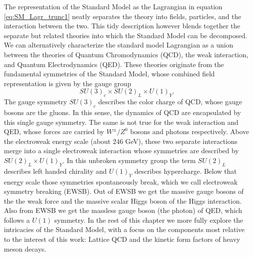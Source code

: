 The representation of the Standard Model as the Lagrangian in equation \ref{eq:SM_Lagr_trunc1} neatly separates the theory into fields, particles, and the interaction between the two.  This tidy description however blends together the separate but related theories into which the Standard Model can be decomposed.  We can alternatively characterize the standard model Lagrangian as a union between the theories of Quantum Chromodynamics (QCD), the weak interaction, and Quantum Electrodynamics (QED). These theories originate from the fundamental symmetries of the Standard Model, whose combined field representation is given by the gauge group
\begin{equation}
    SU(3)_c\times SU(2)_L\times U(1)_Y.
\end{equation}
The gauge symmetry $SU(3)_c$ describes the color charge of QCD, whose gauge bosons are the gluons.  In this sense, the dynamics of QCD are encapsulated by this single gauge symmetry.  The same is not true for the weak interaction and QED, whose forces are carried by $W^\pm/Z^0$ bosons and photons respectively.  Above the electroweak energy scale (about $246$ GeV), these two separate interactions merge into a single electroweak interaction whose symmetries are described by $SU(2)_L\times U(1)_Y$.  In this unbroken symmetry group the term $SU(2)_L$ describes left handed chirality and $U(1)_Y$ describes hypercharge.  Below that energy scale those symmetries spontaneously break, which we call electroweak symmetry breaking (EWSB).  Out of EWSB we get the massive gauge bosons of the the weak force and the massive scalar Higgs boson of the Higgs interaction.  Also from EWSB we get the massless gauge boson (the photon) of QED, which follows a $U(1)$ symmetry.   In the rest of this chapter we more fully explore the intricacies of the Standard Model, with a focus on the components most relative to the interest of this work: Lattice QCD and the kinetic form factors of heavy meson decays.


